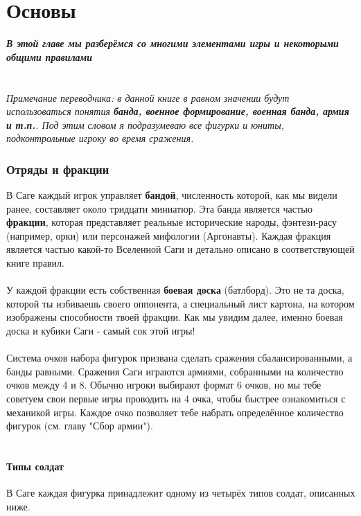 \documentclass[a4paper,11pt,twoside]{article}
\begin{document}
\part{Основы}
\textbf{\textit{В этой главе мы разберёмся со многими элементами игры и некоторыми общими правилами }} \\ \\ \\
\textit{Примечание переводчика: в данной книге в равном значении будут использоваться понятия \textbf{банда, военное формирование, военная банда, армия и т.п.}. Под этим словом я подразумеваю все фигурки и юниты, подконтрольные игроку во время сражения.}
   \section*{Отряды и фракции}
В Саге каждый игрок управляет \textbf{бандой}, численность которой, как мы видели ранее, составляет около тридцати миниатюр. Эта банда является частью \textbf{фракции}, которая представляет реальные исторические народы, фэнтези-расу (например, орки) или персонажей мифологии (Аргонавты). Каждая фракция является частью какой-то Вселенной Саги и детально описано в соответствующей книге правил. \\ \\ 
У каждой фракции есть собственная \textbf{боевая доска} (батлборд). Это не та доска, которой ты избиваешь своего оппонента, а специальный лист картона, на котором изображены способности твоей фракции. Как мы увидим далее, именно боевая доска и кубики Саги - самый сок этой игры! \\ \\ 
Система очков набора фигурок призвана сделать сражения сбалансированными, а банды равными. Сражения Саги играются армиями, собранными на количество очков между 4 и 8. Обычно игроки выбирают формат 6 очков, но мы тебе советуем свои первые игры проводить на 4 очка, чтобы быстрее ознакомиться с механикой игры. Каждое очко позволяет тебе набрать определённое количество фигурок (см. главу "Сбор армии"). \\ \\ 

\subsection*{Типы солдат}
В Саге каждая фигурка принадлежит одному из четырёх типов солдат, описанных ниже.
\end{document}
